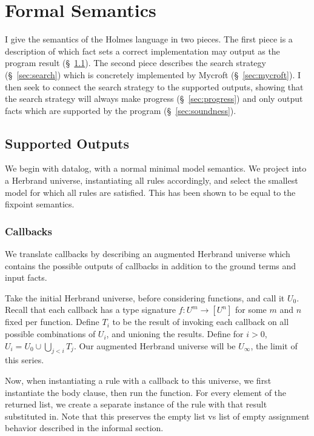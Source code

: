 \section{Formal Semantics}
\label{sec:formal}
I give the semantics of the Holmes language in two pieces.
The first piece is a description of which fact sets a correct implementation may output as the program result (\S~\ref{sec:allowed}).
The second piece describes the search strategy (\S~\ref{sec:search}) which is concretely implemented by Mycroft (\S~\ref{sec:mycroft}).
I then seek to connect the search strategy to the supported outputs, showing that the search strategy will always make progress (\S~\ref{sec:progress}) and only output facts which are supported by the program (\S~\ref{sec:soundness}).
\subsection{Supported Outputs}
\label{sec:allowed}
We begin with datalog, with a normal minimal model semantics.
We project into a Herbrand universe, instantiating all rules accordingly, and select the smallest model for which all rules are satisfied.
This has been shown to be equal to the fixpoint semantics.

\subsubsection{Callbacks}
We translate callbacks by describing an augmented Herbrand universe which contains the possible outputs of callbacks in addition to the ground terms and input facts.

Take the initial Herbrand universe, before considering functions, and call it $U_0$.
Recall that each callback has a type signature $f : U^m \rightarrow [U^n]$ for some $m$ and $n$ fixed per function.
Define $T_i$ to be the result of invoking each callback on all possible combinations of $U_i$, and unioning the results.
Define for $i > 0$, $U_i = U_0 \cup \bigcup_{j < i} T_j$.
Our augmented Herbrand universe will be $U_\infty$, the limit of this series.

Now, when instantiating a rule with a callback to this universe, we first instantiate the body clause, then run the function.
For every element of the returned list, we create a separate instance of the rule with that result substituted in.
Note that this preserves the empty list vs list of empty assignment behavior described in the informal section.

